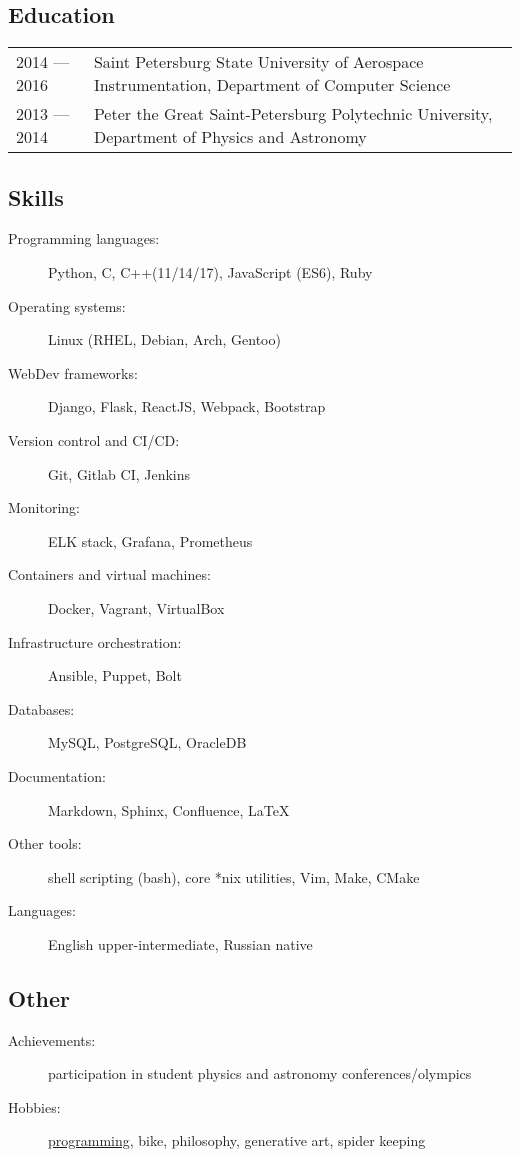 \documentclass[12pt]{report}
\begin{document}
\subsection*{Education}
\begin{table}[!h]
    \begin{tabular}{@{}p{}p{}}
        2014 --- 2016 & Saint Petersburg State University of Aerospace Instrumentation, Department of Computer Science \\
        2013 --- 2014 & Peter the Great Saint-Petersburg Polytechnic University, Department of Physics and Astronomy
    \end{tabular}
\end{table}

\subsection*{Skills}
\begin{description}
    \item[Programming languages:]
    Python, C, C++(11/14/17), JavaScript (ES6), Ruby
    \item[Operating systems:]
    Linux (RHEL, Debian, Arch, Gentoo)
    \item[WebDev frameworks:]
    Django, Flask, ReactJS, Webpack, Bootstrap
    \item[Version control and CI/CD:]
    Git, Gitlab CI, Jenkins
    \item[Monitoring:]
    ELK stack, Grafana, Prometheus
    \item[Containers and virtual machines:]
    Docker, Vagrant, VirtualBox
    \item[Infrastructure orchestration:]
    Ansible, Puppet, Bolt
    \item[Databases:]
    MySQL, PostgreSQL, OracleDB
    \item[Documentation:]
    Markdown, Sphinx, Confluence, LaTeX
    \item[Other tools:]
    shell scripting (bash), core *nix utilities, Vim, Make, CMake
    \item[Languages:]
    English upper-intermediate, Russian native
\end{description}

\subsection*{Other}
\begin{description}
    \item[Achievements:]
    participation in student physics and astronomy conferences/olympics
    \item[Hobbies:]
    \href{https://github.com/unsip}{programming}, bike, philosophy, generative art, spider keeping
\end{description}
\end{document}
